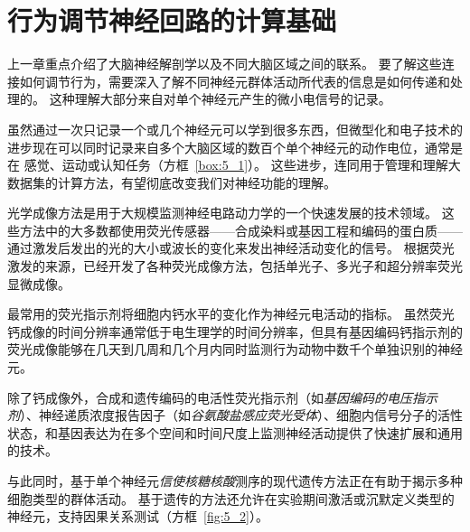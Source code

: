 \chapter{行为调节神经回路的计算基础} \label{chap:chap5}

上一章重点介绍了大脑神经解剖学以及不同大脑区域之间的联系。
要了解这些连接如何调节行为，需要深入了解不同神经元群体活动所代表的信息是如何传递和处理的。
这种理解大部分来自对单个神经元产生的微小电信号的记录。


虽然通过一次只记录一个或几个神经元可以学到很多东西，但微型化和电子技术的进步现在可以同时记录来自多个大脑区域的数百个单个神经元的动作电位，通常是在 感觉、运动或认知任务（方框~\ref{box:5_1}）。 
这些进步，连同用于管理和理解大数据集的计算方法，有望彻底改变我们对神经功能的理解。


\begin{proposition}[光学神经成像] \label{box:5_1}
	
	\quad \quad 光学成像方法是用于大规模监测神经电路动力学的一个快速发展的技术领域。
	这些方法中的大多数都使用荧光传感器——合成染料或基因工程和编码的蛋白质——通过激发后发出的光的大小或波长的变化来发出神经活动变化的信号。
	根据荧光激发的来源，已经开发了各种荧光成像方法，包括单光子、多光子和超分辨率荧光显微成像。
	
	\quad \quad 最常用的荧光指示剂将细胞内钙水平的变化作为神经元电活动的指标。
	虽然荧光钙成像的时间分辨率通常低于电生理学的时间分辨率，但具有基因编码钙指示剂的荧光成像能够在几天到几周和几个月内同时监测行为动物中数千个单独识别的神经元。
	
	\quad \quad 除了钙成像外，合成和遗传编码的电活性荧光指示剂（如\textit{基因编码的电压指示剂}）、神经递质浓度报告因子（如\textit{谷氨酸盐感应荧光受体}）、细胞内信号分子的活性状态，和基因表达为在多个空间和时间尺度上监测神经活动提供了快速扩展和通用的技术。
	
\end{proposition}


与此同时，基于单个神经元\textit{信使核糖核酸}测序的现代遗传方法正在有助于揭示多种细胞类型的群体活动。
基于遗传的方法还允许在实验期间激活或沉默定义类型的神经元，支持因果关系测试（方框~\ref{fig:5_2}）。


